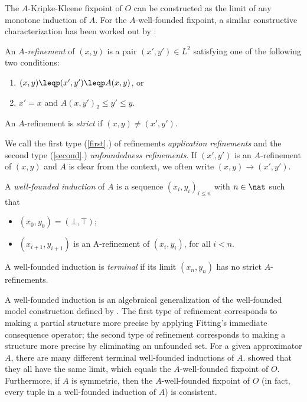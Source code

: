 The $A$-Kripke-Kleene fixpoint of $O$ can be constructed as the limit of any monotone induction of $A$. 
For the $A$-well-founded fixpoint, a similar constructive characterization has been worked out by \citet{lpnmr/DeneckerV07}:

\begin{definition}\label{002:def:refinement}
An \emph{$A$-refinement} of $(x,y)$ is a pair $(x',y')\in L^2$ satisfying one of the following two conditions:
\begin{enumerate}
	\item $(x,y)\leqp(x',y')\leqp A(x,y)$, or \label{first}
	\item $x'=x$ and  $A(x,y')_2\leq y'\leq y$. \label{second}
\end{enumerate}
An $A$-refinement is \emph{strict} if $(x,y)\neq (x',y')$.
\end{definition}

We call the first type (\ref{first}.) of refinements \emph{application refinements} and the second type (\ref{second}.) \emph{unfoundedness refinements}. If $(x',y')$ is an $A$-refinement of $(x,y)$ and $A$ is clear from the context, we often write $(x,y)\to(x',y')$.
%

 \begin{definition}
 A \emph{well-founded induction} of $A$  is a sequence 
$(x_i,y_i)_{i\leq n}$
with $n\in\nat$ such that 
\begin{itemize}
	\item $(x_0,y_0) = (\bot,\top)$;
	\item $(x_{i+1},y_{i+1})$ is an A-refinement of $(x_{i},y_{i})$, for  all $i<n$.
\end{itemize}
A well-founded induction is \emph{terminal} if its limit $(x_n,y_n)$ has no strict $A$-refinements.
\end{definition}
A well-founded induction is an algebraical generalization of the well-founded model construction defined by \citet{GelderRS91}. 
The first type of refinement corresponds to making a partial structure more precise by applying Fitting's immediate consequence operator; the second type of refinement corresponds to making a structure more precise by eliminating an unfounded set. 
For a given approximator $A$, there are many different terminal well-founded inductions of $A$.
\citet{lpnmr/DeneckerV07}  showed that they all have the same limit, which equals the $A$-well-founded fixpoint of $O$. Furthermore, if $A$ is symmetric, then the $A$-well-founded fixpoint of $O$ (in fact, every tuple in a well-founded induction of $A$) is consistent.

